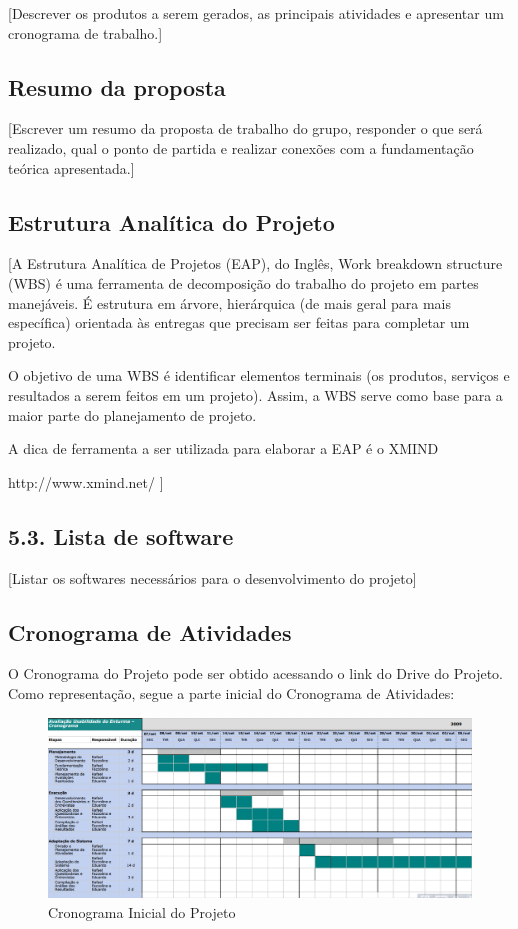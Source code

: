 
[Descrever os produtos a serem gerados, as principais atividades e apresentar um cronograma de trabalho.]

\subsection{Resumo da proposta}
	
	[Escrever um resumo da proposta de trabalho do grupo, responder o que será realizado, qual o ponto de partida e realizar conexões com a fundamentação teórica apresentada.]

\subsection{Estrutura Analítica do Projeto}
	
	[A Estrutura Analítica de Projetos (EAP), do Inglês, Work breakdown structure (WBS) é uma ferramenta de decomposição do trabalho do projeto em partes manejáveis. É estrutura em árvore, hierárquica (de mais geral para mais específica) orientada às entregas que precisam ser feitas para completar um projeto.

	O objetivo de uma WBS é identificar elementos terminais (os produtos, serviços e resultados a serem feitos em um projeto). Assim, a WBS serve como base para a maior parte do planejamento de projeto.
	
	A dica de ferramenta a ser utilizada para elaborar a EAP é o XMIND 
	
	http://www.xmind.net/ ]

\subsection{5.3. Lista de software}
	
	[Listar os softwares necessários para o desenvolvimento do projeto]

\subsection{Cronograma de Atividades}

	O Cronograma do Projeto pode ser obtido acessando o link do Drive do Projeto. Como representação, segue a parte inicial do Cronograma de Atividades:

	\begin{figure}[H]
		\centering
		\includegraphics[width=1\textwidth]{imagens/cronograma}
		\caption{Cronograma Inicial do Projeto}
		\label{img:cronograma}
	\end{figure}

